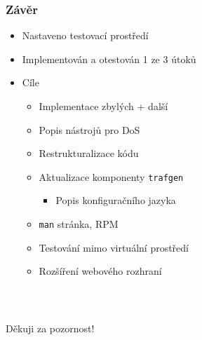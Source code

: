 \documentclass[%
  12pt,       				%
	t,                  %
	aspectratio=1610,   %
	unicode,						%
czech,              %
]{beamer}				    	%
\begin{document}
\begin{frame} 
	\frametitle{Závěr}
	\begin{itemize}
		\item Nastaveno testovací prostředí
		\item Implementován a otestován 1 ze 3 útoků
		\item Cíle
		\begin{itemize}
			\item Implementace zbylých + další
			\item Popis nástrojů pro DoS
			\item Restrukturalizace kódu
			\item Aktualizace komponenty \texttt{trafgen}
			\begin{itemize}
				\item Popis konfiguračního jazyka
			\end{itemize}
			\item \texttt{man} stránka, RPM
			\item Testování mimo virtuální prostředí
			\item Rozšíření webového rozhraní
		\end{itemize}
	\end{itemize}
\end{frame}


\begin{frame}[c] 
	\frametitle{\mbox{ }}
	\begin{center}
		{\Huge Děkuji za pozornost!}
	\end{center}
\end{frame}

\end{document}
